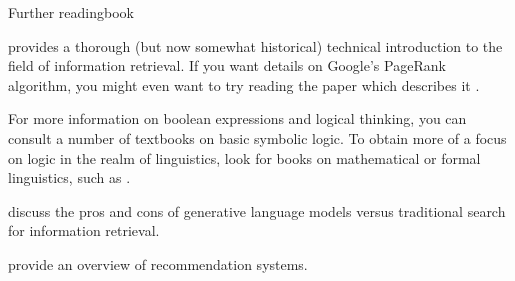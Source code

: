 \begin{tblsfilledsymbol}{Further reading}{book}
    

 \citet{manning-et-al:08} provides a thorough (but now somewhat historical) technical introduction to the field of information
retrieval.  If you want details on Google's PageRank algorithm, you might
even want to try reading the paper which describes it
\citep{pagerank:99}.

For more information on boolean expressions and logical thinking, you
can consult a number of textbooks on basic symbolic logic.  To obtain
more of a focus on logic in the realm of linguistics, look for books
on mathematical or formal linguistics, such as
\citet{partee-et-al:90}.

\citet{ShahBender:2022} discuss the pros and cons of generative language models versus traditional search for information retrieval.

\citet{Lu-etal:2015} provide an overview of recommendation systems.

\end{tblsfilledsymbol}


